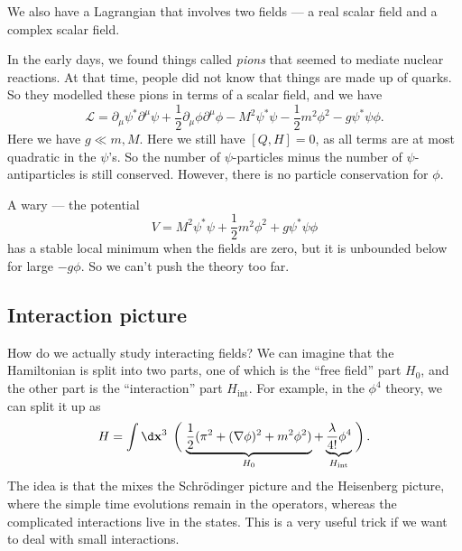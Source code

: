 \documentclass[a4paper]{article}
\begin{document}
We also have a Lagrangian that involves two fields --- a real scalar field and a complex scalar field.
\begin{eg}
  In the early days, we found things called \emph{pions} that seemed to mediate nuclear reactions. At that time, people did not know that things are made up of quarks. So they modelled these pions in terms of a scalar field, and we have
  \[
    \mathcal{L} = \partial_\mu \psi^* \partial^\mu \psi + \frac{1}{2} \partial_\mu \phi \partial^\mu \phi - M^2 \psi^* \psi - \frac{1}{2} m^2 \phi^2 - g \psi^* \psi \phi.
  \]
  Here we have $g \ll m, M$. Here we still have $[Q, H] = 0$, as all terms are at most quadratic in the $\psi$'s. So the number of $\psi$-particles minus the number of $\psi$-antiparticles is still conserved. However, there is no particle conservation for $\phi$.

  A wary --- the potential
  \[
    V = M^2 \psi^* \psi + \frac{1}{2} m^2 \phi^2 + g \psi^*\psi \phi
  \]
  has a stable local minimum when the fields are zero, but it is unbounded below for large $-g \phi$. So we can't push the theory too far.
\end{eg}

\subsection{Interaction picture}
How do we actually study interacting fields? We can imagine that the Hamiltonian is split into two parts, one of which is the ``free field'' part $H_0$, and the other part is the ``interaction'' part $H_{\mathrm{int}}$. For example, in the $\phi^4$ theory, we can split it up as
\[
  H = \int\d \mathbf{x}^3\;\left(\vphantom{\frac{\lambda}{4}}\right.\underbrace{\frac{1}{2} (\pi^2 + (\nabla \phi)^2 + m^2 \phi^2)}_{H_0} + \underbrace{\frac{\lambda}{4!} \phi^4}_{H_{\mathrm{int}}}\left.\vphantom{\frac{\lambda}{4!}}\right).
\]
The idea is that the  mixes the Schr\"odinger picture and the Heisenberg picture, where the simple time evolutions remain in the operators, whereas the complicated interactions live in the states. This is a very useful trick if we want to deal with small interactions.
\end{document}

